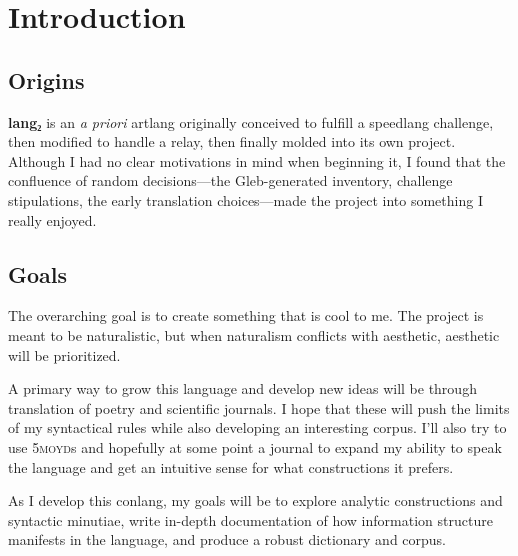 \documentclass[fontsize=12pt,twoside=false,numbers=noenddot]{class/kaobook}
\title[A Grammar of \langname{}]{\huge \langname{}}
\subtitle{grammar of a constructed language}
\author[kilenc]{\large Seth Thompson \\ \small \textit{aka} kilenc}
\date{\small \today}
\newcommand{\langname}{\textbf{lang₂}}
\newcommand{\tsc}[1]{\textsc{#1}}
\begin{document}
\frontmatter

\maketitle
{}

\setlength{\textheight}{23cm} %
\etocstandarddisplaystyle %
\etocstandardlines %
\tableofcontents 


\setchapterpreamble[u]{\margintoc}
\chapter{Introduction}
\section{Origins}
\langname{} is an \emph{a priori} artlang originally conceived to fulfill a speedlang challenge, then modified to handle a relay, then finally molded into its own project. Although I had no clear motivations in mind when beginning it, I found that the confluence of random decisions---the Gleb-generated inventory, challenge stipulations, the early translation choices---made the project into something I really enjoyed.

\section{Goals}
The overarching goal is to create something that is cool to me. The project is meant to be naturalistic, but when naturalism conflicts with aesthetic, aesthetic will be prioritized.

A primary way to grow this language and develop new ideas will be through translation of poetry and scientific journals. I hope that these will push the limits of my syntactical rules while also developing an interesting corpus. I'll also try to use \tsc{5moyd}s and hopefully at some point a journal to expand my ability to speak the language and get an intuitive sense for what constructions it prefers.

As I develop this conlang, my goals will be to explore analytic constructions and syntactic minutiae, write in-depth documentation of how information structure manifests in the language, and produce a robust dictionary and corpus.
\end{document}
